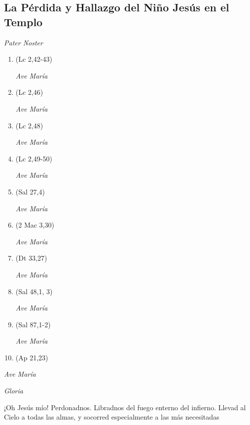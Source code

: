 \documentclass[a4paper,11pt, oneside]{report}
\begin{document}
      \subsection*{La Pérdida y Hallazgo del Niño Jesús en el Templo}
      
        \textit{Pater Noster}

        \begin{enumerate}

          \item (Lc 2,42-43)
          
          \textit{Ave María}

          \item (Lc 2,46)
          
          \textit{Ave María}

          \item (Lc 2,48)
          
          \textit{Ave María}

          \item (Lc 2,49-50)
          
          \textit{Ave María}

          \item (Sal 27,4)

          \textit{Ave María}

          \item (2 Mac 3,30)
          
          \textit{Ave María}

          \item (Dt 33,27)
          
          \textit{Ave María}

          \item (Sal 48,1, 3)
          
          \textit{Ave María}

          \item (Sal 87,1-2)
          
          \textit{Ave María}

          \item (Ap 21,23)

        \end{enumerate}

        \textit{Ave María} \par
        \indent\textit{Gloria} \par
        \indent¡Oh Jesús mío! Perdonadnos. Libradnos del fuego enterno del infierno. Llevad al Cielo a todas las almas, y socorred especialmente a las más 
        necesitadas
        
\end{document}
